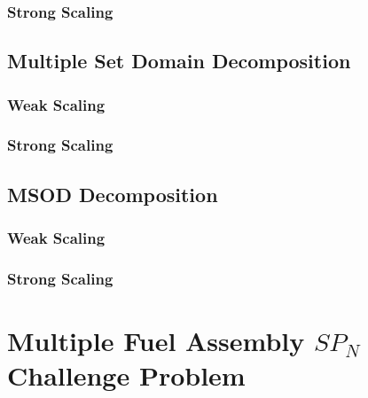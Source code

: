 \subsubsection{Strong Scaling}
\label{subsubsec:overlapping_strong}

\subsection{Multiple Set Domain Decomposition}
\label{subsec:multiple_set_decomposition}

\subsubsection{Weak Scaling}
\label{subsubsec:multiple_set_weak}

\subsubsection{Strong Scaling}
\label{subsubsec:multiple_set_strong}

\subsection{MSOD Decomposition}
\label{subsec:msod_decomposition}

\subsubsection{Weak Scaling}
\label{subsubsec:msod_weak}

\subsubsection{Strong Scaling}
\label{subsubsec:msod_strong}

\section{Multiple Fuel Assembly $SP_N$ Challenge Problem}
\label{sec:spn_challenge_problem}
